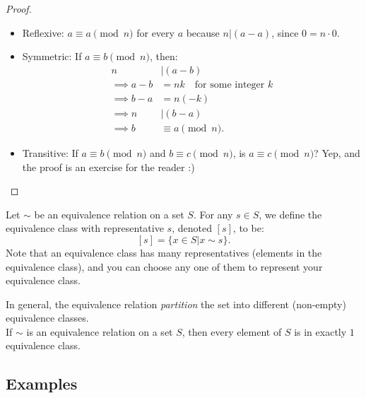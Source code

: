 \begin{proof}\quad
\begin{itemize}
    \item Reflexive: $a \equiv a \pmod n$ for every $a$ because $n | (a - a)$, since $0 = n \cdot 0$.
    \item Symmetric: If $a \equiv b \pmod n$, then:
    \begin{align*}
        n &| (a - b) \\
        \implies a - b &= nk \quad \text{for some integer $k$}\\
        \implies b - a &= n(-k) \\
        \implies n &| (b - a) \\
        \implies b &\equiv a \pmod n.
    \end{align*}
    \item Transitive: If $a \equiv b \pmod n$ and $b \equiv c \pmod n$, is $a \equiv c \pmod n$? Yep, and the proof is an exercise for the reader :)
\end{itemize}
\end{proof}

\begin{definition}
Let $\sim$ be an equivalence relation on a set $S$. For any $s \in S$, we define the equivalence class with representative $s$, denoted $[s]$, to be:
\[
[s] = \{x \in S | x \sim s\}.
\]
Note that an equivalence class has many representatives (elements in the equivalence class), and you can choose any one of them to represent your equivalence class.
\end{definition}

In general, the equivalence relation \textit{partition} the set into different (non-empty) equivalence classes.\\

If $\sim$ is an equivalence relation on a set $S$, then every element of $S$ is in exactly $1$ equivalence class.

\subsection{Examples}

